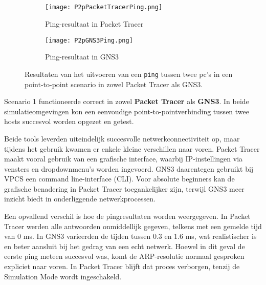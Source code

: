\subsection{}
\begin{figure}[H]
    \centering
    \begin{subfigure}[b]{0.48\textwidth}
        \centering
        \texttt{[image: P2pPacketTracerPing.png]}
        \caption{Ping-resultaat in Packet Tracer}
        \label{fig:ping_pt}
    \end{subfigure}
    \hfill
    \begin{subfigure}[b]{0.48\textwidth}
        \centering
        \texttt{[image: P2pGNS3Ping.png]}
        \caption{Ping-resultaat in GNS3}
        \label{fig:ping_gns3}
    \end{subfigure}
    \caption[Vergelijking van ping resultaten tussen Packet Tracer en GNS3]{Resultaten van het uitvoeren van een \texttt{ping} tussen twee pc’s in een point-to-point scenario in zowel Packet Tracer als GNS3.}
    \label{fig:ping_pt_gns3}
\end{figure}

Scenario 1 functioneerde correct in zowel \textbf{Packet Tracer} als \textbf{GNS3}. In beide simulatieomgevingen kon een eenvoudige point-to-pointverbinding tussen twee hosts succesvol worden opgezet en getest.

\vspace{0.3cm}

Beide tools leverden uiteindelijk succesvolle netwerkconnectiviteit op, maar tijdens het gebruik kwamen er enkele kleine verschillen naar voren. Packet Tracer maakt vooral gebruik van een grafische interface, waarbij IP-instellingen via vensters en dropdownmenu’s worden ingevoerd. GNS3 daarentegen gebruikt bij VPCS een command line-interface (CLI). Voor absolute beginners kan de grafische benadering in Packet Tracer toegankelijker zijn, terwijl GNS3 meer inzicht biedt in onderliggende netwerkprocessen.

\vspace{0.3cm}

Een opvallend verschil is hoe de pingresultaten worden weergegeven. In Packet Tracer werden alle antwoorden onmiddellijk gegeven, telkens met een gemelde tijd van 0 ms. In GNS3 varieerden de tijden tussen 0.3 en 1.6 ms, wat realistischer is en beter aansluit bij het gedrag van een echt netwerk. Hoewel in dit geval de eerste ping meteen succesvol was, komt de ARP-resolutie normaal gesproken expliciet naar voren. In Packet Tracer blijft dat proces verborgen, tenzij de Simulation Mode wordt ingeschakeld.


